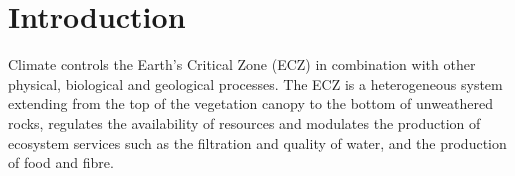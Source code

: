 \documentclass[authoryear,preprint,review,12pt]{elsarticle}
\begin{document}


\section{Introduction}



Climate controls the Earth's Critical Zone (ECZ) in combination with other physical, biological and geological processes.
The ECZ is a heterogeneous system extending from the top of the vegetation canopy to the bottom of unweathered rocks, regulates the availability of resources and modulates the production of ecosystem services such as the filtration and quality of water, and the production of food and fibre.
\end{document}
